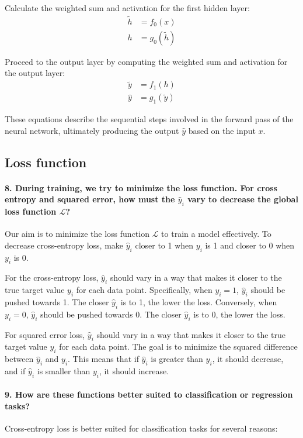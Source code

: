 \documentclass{article}
\theoremstyle{plain}%
\theoremstyle{definition}
\theoremstyle{remark}
\begin{document}
Calculate the weighted sum and activation for the first hidden layer:
\begin{align*}
    \tilde{h} & = f_0(x)         \\
    h         & = g_0(\tilde{h})
\end{align*}

Proceed to the output layer by computing the weighted sum and activation for the output layer:
\begin{align*}
    \tilde{y} & = f_1(h)         \\
    \hat{y}   & = g_1(\tilde{y})
\end{align*}

These equations describe the sequential steps involved in the forward pass of the neural network, ultimately producing the output $\hat{y}$ based on the input $x$.

\subsection{Loss function}
\paragraph{8. During training, we try to minimize the loss function. For cross entropy and squared error, how must the $ \hat{y}_i $  vary to decrease the global loss function $ \mathcal{L} $?}
Our aim is to minimize the loss function $\mathcal{L}$ to train a model effectively. To decrease cross-entropy loss, make $\hat{y}_i$ closer to 1 when $y_i$ is 1 and closer to 0 when $y_i$ is 0.

For the cross-entropy loss, $\hat{y}_i$ should vary in a way that makes it closer to the true target value $y_i$ for each data point. Specifically, when $y_i = 1$, $\hat{y}_i$ should be pushed towards 1. The closer $\hat{y}_i$ is to 1, the lower the loss. Conversely, when $y_i = 0$, $\hat{y}_i$ should be pushed towards 0. The closer $\hat{y}_i$ is to 0, the lower the loss.

For squared error loss, $\hat{y}_i$ should vary in a way that makes it closer to the true target value $y_i$ for each data point. The goal is to minimize the squared difference between $\hat{y}_i$ and $y_i$. This means that if $\hat{y}_i$ is greater than $y_i$, it should decrease, and if $\hat{y}_i$ is smaller than $y_i$, it should increase.

\paragraph{9. How are these functions better suited to classification or regression tasks?}
Cross-entropy loss is better suited for classification tasks for several reasons:
\end{document}
